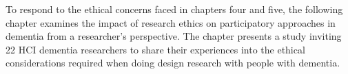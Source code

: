To respond to the ethical concerns faced in chapters four and five, the following chapter examines the impact of research ethics on participatory approaches in dementia from a researcher's perspective. The chapter presents a study inviting 22 HCI dementia researchers to share their experiences into the ethical considerations required when doing design research with people with dementia.



